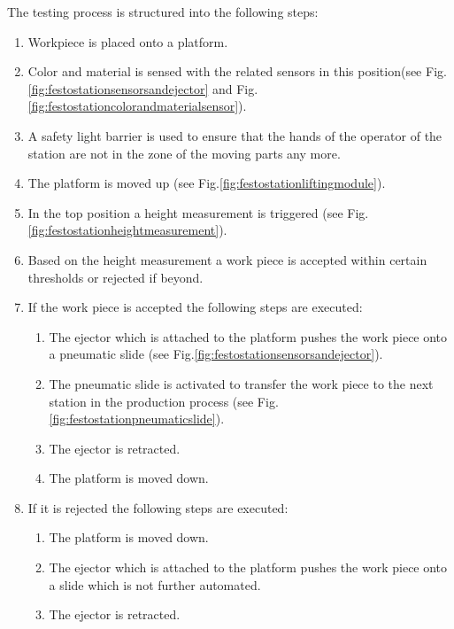 The testing process is structured into the following steps:
\begin{enumerate}[noitemsep]
	\item Workpiece is placed onto a platform.
	\item Color and material is sensed with the related sensors in this position(see Fig. \ref{fig:festostationsensorsandejector} and Fig.\ref{fig:festostationcolorandmaterialsensor}).
	\item A safety light barrier is used to ensure that the hands of the operator of the station are not in the zone of the moving parts any more.
	\item The platform is moved up (see Fig.\ref{fig:festostationliftingmodule}).
	\item In the top position a height measurement is triggered (see Fig.\ref{fig:festostationheightmeasurement}).
	\item Based on the height measurement a work piece is accepted within certain thresholds or rejected if beyond.
	\item If the work piece is accepted the following steps are executed:
	\begin{enumerate}
		\item The ejector which is attached to the platform pushes the work piece onto a pneumatic slide (see Fig.\ref{fig:festostationsensorsandejector}). 
		\item The pneumatic slide is activated to transfer the work piece to the next station in the production process (see Fig.\ref{fig:festostationpneumaticslide}).
		\item The ejector is retracted.
		\item The platform is moved down.
	\end{enumerate} 
	\item If it is rejected the following steps are executed:
	\begin{enumerate}
		\item The platform is moved down.
		\item The ejector which is attached to the platform pushes the work piece onto a  slide which is not further automated.
		\item The ejector is retracted.
	\end{enumerate}
\end{enumerate}


